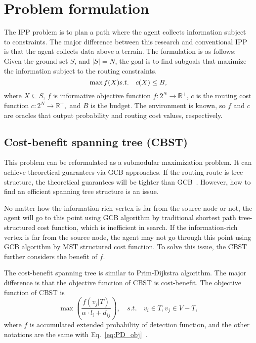 \chapter{Problem formulation}
The IPP problem is to plan a path where the agent collects information subject to constraints.
The major difference between this research and conventional IPP is that the agent collects data above a terrain.
The formulation is as follows:
Given the ground set $S$, and $|S| = N$, the goal is to find subgoals that maximize the information subject to the routing constraints.
\begin{equation}
    \max f(X) \\
    s.t. \quad c(X) \le B,
  \label{eq:obj}
\end{equation}
where $X \subseteq S$,  $f$ is informative objective function $f:2^N \rightarrow \mathbb{R}^{+}$, $c$ is the routing cost function $c: 2^N \rightarrow \mathbb{R}^{+},$ and $B$ is the budget. The environment is known, so $f$ and $c$ are oracles that output probability and routing cost values, respectively.

\section{Cost-benefit spanning tree (CBST)}
This problem can be reformulated as a submodular maximization problem.
It can achieve theoretical guarantees via GCB approaches.
If the routing route is tree structure, the theoretical guarantees will be tighter than GCB~\cite{lin2023improvement}.
However, how to find an efficient spanning tree structure is an issue.

No matter how the information-rich vertex is far from the source node or not,
the agent will go to this point using GCB algorithm by traditional shortest path
tree-structured cost function, which is inefficient in search.
If the information-rich vertex is far from the source node,
the agent may not go through this point using GCB algorithm by MST structured cost function.
To solve this issue, the CBST further considers the benefit of $f$.

The cost-benefit spanning tree is similar to Prim-Dijkstra algorithm.
The major difference is that the objective function of CBST is cost-benefit.
The objective function of CBST is
\begin{equation}
\label{equ:cost_benefit_spanning}
  \max(\frac{f(v_j|T)}{\alpha\cdot l_i+d_{ij}}),\quad s.t.\quad v_i \in T, v_j \in V - T,
\end{equation}
where $f$ is accumulated extended probability of detection function, and the other notations are the same with
Eq.~\ref{eq:PD_obj}~\cite{alpert1993direct}.



